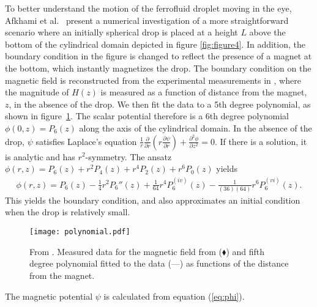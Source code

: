 To better understand the motion of the ferrofluid droplet
moving in the eye, Afkhami et al.~\cite{ARRRP} present 
a numerical investigation of a more straightforward scenario
where an initially spherical drop is placed at a height $L$ above 
the bottom of the cylindrical domain depicted in figure \ref{fig:figure4}. 
In addition, the boundary condition in the figure is changed to reflect 
the presence of a magnet at the bottom, which instantly magnetizes the drop. 
The boundary condition on the magnetic field is reconstructed from the experimental 
measurements in 
\cite{Mefford}, where 
the magnitude of $H(z)$ is measured as a function of distance from 
the magnet, $z$, in the absence of the drop.  
We then fit the data to a 5th degree polynomial, as shown in  
figure~\ref{fig:polynomial}.  
The scalar potential therefore is 
a 6th degree polynomial $\phi(0,z)=P_6(z)$ along the axis of the cylindrical domain.
In the absence of the drop, $\psi$ satisfies Laplace's equation 
$\frac{1}{r}\frac{\partial}{\partial r}(r\frac{\partial\psi}{\partial r})+\frac 
{\partial^2 \phi} {\partial z^2}=0$. If there is a solution, it is analytic and has 
$r^2$-symmetry.  The ansatz $\phi(r,z)=P_6(z)+r^2P_4(z)+r^4P_2(z)+r^6P_0(z)$ yields
\begin{eqnarray}
\phi(r,z)=P_6(z)-\frac{1}{4}r^2P_6''(z)+\frac{1}{64}r^4P_6^{(iv)}(z)-\frac{1}{(36)(64)}r^6P_6^{(vi)}(z). \label{phi}
\end{eqnarray}
This yields the boundary condition, and also approximates an initial condition 
when the drop is relatively small.  
\begin{figure}
\begin{center}
\texttt{[image: polynomial.pdf]}
 \caption{From \cite{ARRRP}. Measured data for the magnetic field from \cite{Mefford} 
($\blacklozenge$) and 
fifth degree  polynomial  fitted to the data (---) as functions of the distance from the 
magnet.}\label{fig:polynomial}
\end{center}
\end{figure}
The magnetic potential $\psi$ is calculated from equation (\ref{eq:phi}).
